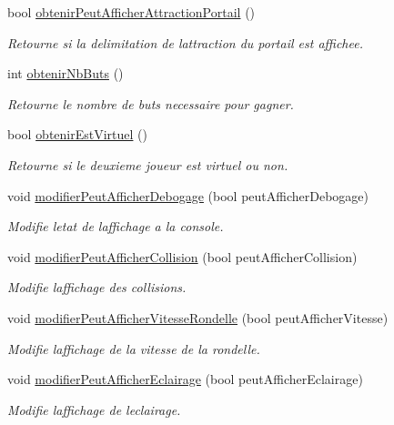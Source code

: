 \begin{DoxyCompactItemize}
bool \hyperlink{group__inf2990_ga4282f01c1d291050c15ab7402dea129a}{obtenir\+Peut\+Afficher\+Attraction\+Portail} ()
\begin{DoxyCompactList}\small\item\em Retourne si la delimitation de l\textquotesingle{}attraction du portail est affichee. \end{DoxyCompactList}\item 
int \hyperlink{group__inf2990_ga8d60ea6dee12a1b82d36274ad9e6362c}{obtenir\+Nb\+Buts} ()
\begin{DoxyCompactList}\small\item\em Retourne le nombre de buts necessaire pour gagner. \end{DoxyCompactList}\item 
bool \hyperlink{group__inf2990_gac7e5058bb5a2b80a640f102458af9537}{obtenir\+Est\+Virtuel} ()
\begin{DoxyCompactList}\small\item\em Retourne si le deuxieme joueur est virtuel ou non. \end{DoxyCompactList}\item 
void \hyperlink{group__inf2990_ga509d6c5ea4660a58257e56f720ac763b}{modifier\+Peut\+Afficher\+Debogage} (bool peut\+Afficher\+Debogage)
\begin{DoxyCompactList}\small\item\em Modifie l\textquotesingle{}etat de l\textquotesingle{}affichage a la console. \end{DoxyCompactList}\item 
void \hyperlink{group__inf2990_gad1c7d8114fb35937d2490fc517f97838}{modifier\+Peut\+Afficher\+Collision} (bool peut\+Afficher\+Collision)
\begin{DoxyCompactList}\small\item\em Modifie l\textquotesingle{}affichage des collisions. \end{DoxyCompactList}\item 
void \hyperlink{group__inf2990_ga57d4438f62d1c44409b00b3ae8fcc813}{modifier\+Peut\+Afficher\+Vitesse\+Rondelle} (bool peut\+Afficher\+Vitesse)
\begin{DoxyCompactList}\small\item\em Modifie l\textquotesingle{}affichage de la vitesse de la rondelle. \end{DoxyCompactList}\item 
void \hyperlink{group__inf2990_ga5ccb734c81a1dbb22f6043417daffc67}{modifier\+Peut\+Afficher\+Eclairage} (bool peut\+Afficher\+Eclairage)
\begin{DoxyCompactList}\small\item\em Modifie l\textquotesingle{}affichage de l\textquotesingle{}eclairage. \end{DoxyCompactList}\item 

\end{DoxyCompactItemize}
